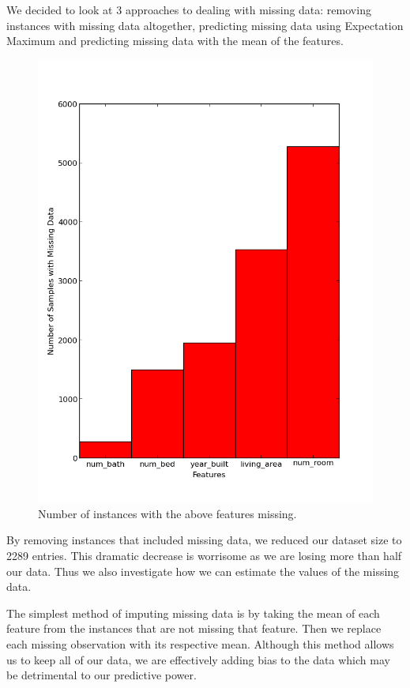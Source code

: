 \documentclass{acm_proc_article-sp}
\begin{document}
	We decided to look at 3 approaches to dealing with missing data: removing instances with missing data altogether, predicting missing data using Expectation Maximum \cite{EM} and predicting missing data with the mean of the features. 
	
	\begin{figure}[h!]
   		\centering
  		\includegraphics[width=\linewidth]{missing_data.png}
    		\caption{Number of instances with the above features missing. }
    		\label{fig:missingdata}
	\end{figure}
	
	By removing instances that included missing data, we reduced our dataset size to 2289 entries. This dramatic decrease is worrisome as we are losing more than half our data. Thus we also investigate how we can estimate the values of the missing data.

	The simplest method of imputing missing data is by taking the mean of each feature from the instances that are not missing that feature. Then we replace each missing observation with its respective mean. Although this method allows us to keep all of our data, we are effectively adding bias to the data which may be detrimental to our predictive power.
	
\end{document}
